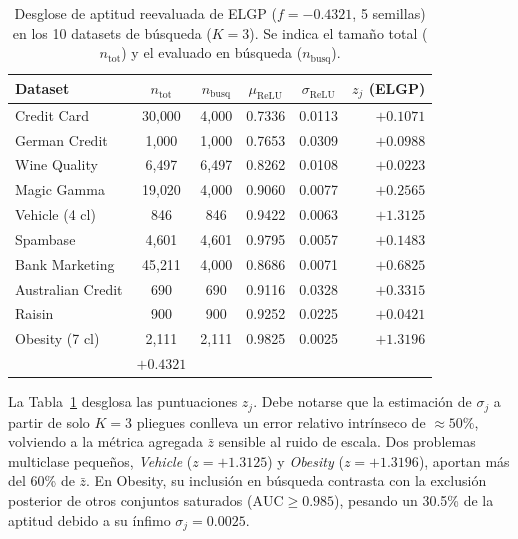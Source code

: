 \documentclass[10pt,twocolumn,letterpaper]{article}
\newcommand{\AUC}{\mathrm{AUC}}
\begin{document}
\begin{table}[!htbp]
\centering
\footnotesize
\setlength{\tabcolsep}{2.5pt}
\caption{Desglose de aptitud reevaluada de ELGP ($f=-0.4321$, 5 semillas) en los 10 datasets de búsqueda ($K=3$). Se indica el tamaño total ($n_{\mathrm{tot}}$) y el evaluado en búsqueda ($n_{\mathrm{busq}}$).}
\label{tab:desglose_z}
\begin{tabularx}{\columnwidth}{@{}>{\raggedright\arraybackslash}Xccccr@{}}
\toprule
Dataset & $n_{\mathrm{tot}}$ & $n_{\mathrm{busq}}$ & $\mu_{\mathrm{ReLU}}$ & $\sigma_{\mathrm{ReLU}}$ & $z_j$ (ELGP) \\
\midrule
Credit Card       & 30{,}000 & 4{,}000 & 0.7336 & 0.0113 & $+0.1071$ \\
German Credit     & 1{,}000  & 1{,}000 & 0.7653 & 0.0309 & $+0.0988$ \\
Wine Quality      & 6{,}497  & 6{,}497 & 0.8262 & 0.0108 & $+0.0223$ \\
Magic Gamma       & 19{,}020 & 4{,}000 & 0.9060 & 0.0077 & $+0.2565$ \\
Vehicle (4 cl)    & 846      & 846     & 0.9422 & 0.0063 & $\mathbf{+1.3125}$ \\
Spambase          & 4{,}601  & 4{,}601 & 0.9795 & 0.0057 & $+0.1483$ \\
Bank Marketing    & 45{,}211 & 4{,}000 & 0.8686 & 0.0071 & $+0.6825$ \\
Australian Credit & 690      & 690     & 0.9116 & 0.0328 & $+0.3315$ \\
Raisin            & 900      & 900     & 0.9252 & 0.0225 & $+0.0421$ \\
Obesity (7 cl)    & 2{,}111  & 2{,}111 & 0.9825 & 0.0025 & $\mathbf{+1.3196}$ \\
\midrule
\multicolumn{5}{@{}l}{\textbf{Promedio ($\bar{z}$)}} & $\mathbf{+0.4321}$ \\
\bottomrule
\end{tabularx}
\end{table}

La Tabla~\ref{tab:desglose_z} desglosa las puntuaciones $z_j$. Debe notarse que la estimación de $\sigma_j$ a partir de solo $K=3$ pliegues conlleva un error relativo intrínseco de $\approx 50\%$, volviendo a la métrica agregada $\bar{z}$ sensible al ruido de escala. Dos problemas multiclase pequeños, \emph{Vehicle} ($z = +1.3125$) y \emph{Obesity} ($z = +1.3196$), aportan más del 60\% de $\bar{z}$. En Obesity, su inclusión en búsqueda contrasta con la exclusión posterior de otros conjuntos saturados ($\AUC \ge 0.985$), pesando un 30.5\% de la aptitud debido a su ínfimo $\sigma_j = 0.0025$.
\end{document}
